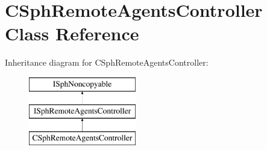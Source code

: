 \hypertarget{classCSphRemoteAgentsController}{\section{C\-Sph\-Remote\-Agents\-Controller Class Reference}
\label{classCSphRemoteAgentsController}
}
Inheritance diagram for C\-Sph\-Remote\-Agents\-Controller\-:\begin{figure}[H]
\begin{center}
\leavevmode
\includegraphics[height=3.000000cm]{classCSphRemoteAgentsController}
\end{center}
\end{figure}
